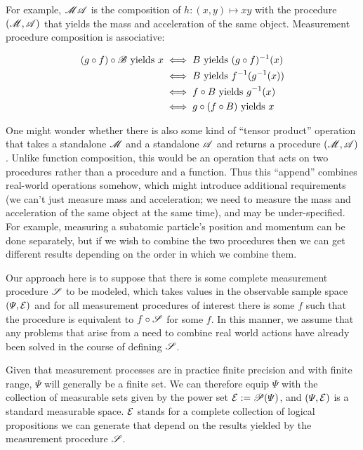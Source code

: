 For example, $\mathscr{MA}$ is the composition of $h:(x,y)\mapsto xy$ with the procedure $(\mathscr{M},\mathscr{A})$ that yields the mass and acceleration of the same object. Measurement procedure composition is associative:

\begin{align}
    (g\circ f)\circ\mathscr{B}\text{ yields } x &\iff B\text{ yields } (g\circ f)^{-1}(x) \\
    &\iff B\text{ yields } f^{-1}(g^{-1}(x))\\
    &\iff f\circ B \text{ yields } g^{-1}(x)\\
    &\iff g\circ(f\circ B)\text{ yields } x
\end{align}


One might wonder whether there is also some kind of ``tensor product'' operation that takes a standalone $\mathscr{M}$ and a standalone $\mathscr{A}$ and returns a procedure $(\mathscr{M},\mathscr{A})$. Unlike function composition, this would be an operation that acts on two procedures rather than a procedure and a function. Thus this ``append'' combines real-world operations somehow, which might introduce additional requirements (we can't just measure mass and acceleration; we need to measure the mass and acceleration of the same object at the same time), and may be under-specified. For example, measuring a subatomic particle's position and momentum can be done separately, but if we wish to combine the two procedures then we can get different results depending on the order in which we combine them.

Our approach here is to suppose that there is some complete measurement procedure $\mathscr{S}$ to be modeled, which takes values in the observable sample space $(\Psi,\mathcal{E})$ and for all measurement procedures of interest there is some $f$ such that the procedure is equivalent to $f\circ \mathscr{S}$ for some $f$. In this manner, we assume that any problems that arise from a need to combine real world actions have already been solved in the course of defining $\mathscr{S}$.

Given that measurement processes are in practice finite precision and with finite range, $\Psi$ will generally be a finite set. We can therefore equip $\Psi$ with the collection of measurable sets given by the power set $\mathcal{E}:=\mathscr{P}(\Psi)$, and $(\Psi,\mathcal{E})$ is a standard measurable space. $\mathcal{E}$ stands for a complete collection of logical propositions we can generate that depend on the results yielded by the measurement procedure $\mathscr{S}$.

